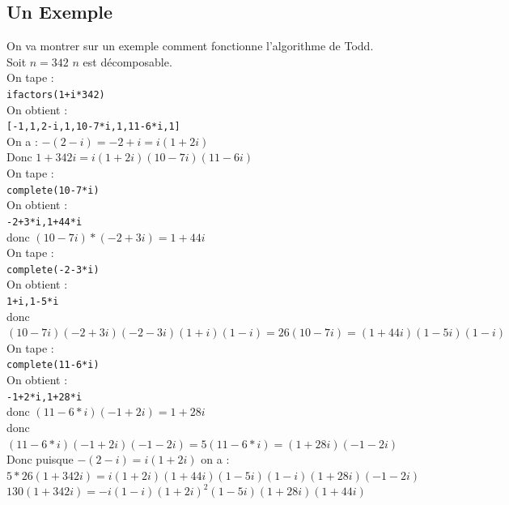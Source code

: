 \documentclass[a4paper,11pt]{book}
\begin{document}
\subsection{Un Exemple} 
On va montrer sur un exemple comment fonctionne l'algorithme de Todd.\\
Soit $n=342$ $n$ est d\'ecomposable.\\
On tape :\\
{\tt ifactors(1+i*342)}\\
On obtient :\\
{\tt [-1,1,2-i,1,10-7*i,1,11-6*i,1]}\\
On a : $-(2-i)=-2+i=i(1+2i)$\\
Donc $1+342i=i(1+2i)(10-7i)(11-6i)$\\
On tape :\\
{\tt complete(10-7*i)}\\
On obtient :\\
{\tt -2+3*i,1+44*i}\\
donc $(10-7i)*(-2+3i)=1+44i$\\
On tape :\\
{\tt complete(-2-3*i)}\\
On obtient :\\
{\tt 1+i,1-5*i}\\
donc \\
$(10-7i)(-2+3i)(-2-3i)(1+i)(1-i)=26(10-7i)=(1+44i)(1-5i)(1-i)$\\
On tape :\\
{\tt complete(11-6*i)}\\
On obtient :\\
{\tt -1+2*i,1+28*i}\\
donc $(11-6*i)(-1+2i)=1+28i$\\
donc $(11-6*i)(-1+2i)(-1-2i)=5(11-6*i)=(1+28i)(-1-2i)$\\
Donc puisque $-(2-i)=i(1+2i)$ on a :\\
$5*26(1+342i)=i(1+2i)(1+44i)(1-5i)(1-i)(1+28i)(-1-2i)$\\
$130(1+342i)=-i(1-i)(1+2i)^2(1-5i)(1+28i)(1+44i)$
\end{document}
